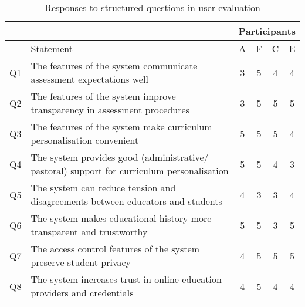 \begin{table}[!ht]
	\caption{Responses to structured questions in user evaluation}
	\centering
	\label{table:structuredresp_eval}
	\begin{tabularx}{\textwidth}{|c|X|c|c|c|c|}
		\hline
		   &                                                                                            & \multicolumn{4}{c|}{Participants}                                                                                \\
		\hline
		   & Statement                                                                                  & A                                 & F                      & C                        & E                        \\
		\hline
		Q1 & The features of the system communicate assessment expectations well                        & \cellcolor{Dandelion}3            & \cellcolor{green}5     & \cellcolor{SpringGreen}4 & \cellcolor{SpringGreen}4 \\
		\hline
		Q2 & The features of the system improve transparency in assessment procedures                   & \cellcolor{Dandelion}3            & \cellcolor{green}5     & \cellcolor{green}5       & \cellcolor{green}5       \\
		\hline
		Q3 & The features of the system make curriculum personalisation convenient                      & \cellcolor{green}5                & \cellcolor{green}5     & \cellcolor{green}5       & \cellcolor{SpringGreen}4 \\
		\hline
		Q4 & The system provides good (administrative/ pastoral) support for curriculum personalisation & \cellcolor{green}5                & \cellcolor{green}5     & \cellcolor{SpringGreen}4 & \cellcolor{Dandelion}3   \\
		\hline
		Q5 & The system can reduce tension and disagreements between educators and students             & \cellcolor{SpringGreen}4          & \cellcolor{Dandelion}3 & \cellcolor{Dandelion}3   & \cellcolor{SpringGreen}4 \\
		\hline
		Q6 & The system makes educational history more transparent and trustworthy                      & \cellcolor{green}5                & \cellcolor{green}5     & \cellcolor{Dandelion}3   & \cellcolor{green}5       \\
		\hline
		Q7 & The access control features of the system preserve student privacy                         & \cellcolor{SpringGreen}4          & \cellcolor{green}5     & \cellcolor{green}5       & \cellcolor{green}5       \\
		\hline
		Q8 & The system increases trust in online education providers and credentials                   & \cellcolor{SpringGreen}4          & \cellcolor{green}5     & \cellcolor{SpringGreen}4 & \cellcolor{SpringGreen}4 \\
		\hline
	\end{tabularx}
\end{table}

